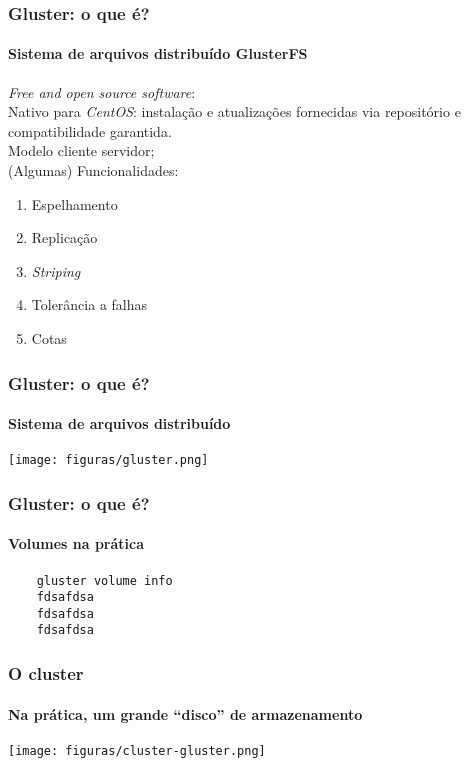\documentclass[svgnames,smaller,table]{beamer}
\begin{document}
\begin{frame}
  \frametitle{Gluster: o que é?}
  \framesubtitle{Sistema de arquivos distribuído \textbf{GlusterFS}}

\textbullet  \textit{Free and open source software}:\\%
\textbullet  Nativo para \textit{CentOS}: instalação e atualizações fornecidas via repositório e compatibilidade garantida.\\
\textbullet  Modelo cliente servidor;\\
  \vspace{0.2cm}
  (Algumas) Funcionalidades:

  \begin{enumerate}
  \item Espelhamento
  \item Replicação
  \item \textit{Striping}
  \item Tolerância a falhas
  \item Cotas
  \end{enumerate}

\end{frame}


\begin{frame}
  \frametitle{Gluster: o que é?}
  \framesubtitle{Sistema de arquivos distribuído}
    \begin{center}
      \texttt{[image: figuras/gluster.png]}
    \end{center}
\end{frame}

\begin{frame}[fragile]
  \frametitle{Gluster: o que é?}
  \framesubtitle{Volumes na prática}
  \begin{lstlisting}
    gluster volume info
    fdsafdsa
    fdsafdsa
    fdsafdsa
  \end{lstlisting}
\end{frame}

\begin{frame}
  \frametitle{O cluster}
  \framesubtitle{Na prática, um grande ``disco'' de armazenamento}
    \begin{center}
      \texttt{[image: figuras/cluster-gluster.png]}
        \end{center}
\end{frame}
\end{document}
